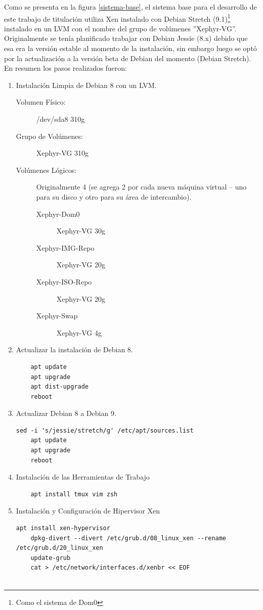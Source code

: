 Como se presenta en la figura \ref{sistema-base}, el sistema base para el desarrollo de este trabajo de titulación utiliza Xen instalado con Debian Stretch (9.1)\footnote{Como el sistema de Dom0} instalado en un LVM con el nombre del grupo de volúmenes ''Xephyr-VG''. Originalmente se tenía planificado trabajar con Debian Jessie (8.x) debido que esa era la versión estable al momento de la instalación, sin embargo luego se optó por la actualización a la versión beta de Debian del momento (Debian Stretch). En resumen los pasos realizados fueron:
\lstset{language=Bash}
\begin{enumerate}
	\item Instalación Limpia de Debian 8 con un LVM.
    	\begin{description}
    		\item[Volumen Físico:] /dev/sda8 310g 
            \item[Grupo de Volúmenes:] Xephyr-VG 310g
            \item[Volúmenes Lógicos:] Originalmente 4 (se agrega 2 por cada nueva máquina virtual -- uno para su disco y otro para su área de intercambio).
            \begin{description}
            	\item[Xephyr-Dom0] Xephyr-VG 30g
                \item[Xephyr-IMG-Repo] Xephyr-VG 20g
                \item[Xephyr-ISO-Repo] Xephyr-VG 20g
                \item[Xephyr-Swap] Xephyr-VG 4g
            \end{description}
    	\end{description}
    \item Actualizar la instalación de Debian 8.
    	\begin{lstlisting}
	apt update
	apt upgrade
	apt dist-upgrade
	reboot
        \end{lstlisting}
    \item Actualizar Debian 8 a Debian 9.
        \begin{lstlisting}[breaklines=true]
	sed -i 's/jessie/stretch/g' /etc/apt/sources.list
	apt update
	apt upgrade
	reboot
        \end{lstlisting}
    \item Instalación de las Herramientas de Trabajo
        \begin{lstlisting}
	apt install tmux vim zsh
        \end{lstlisting}
    \item Instalación y Configuración de Hipervisor Xen
		\begin{lstlisting}[breaklines=true]
	apt install xen-hypervisor
	dpkg-divert --divert /etc/grub.d/08_linux_xen --rename /etc/grub.d/20_linux_xen
	update-grub
	cat > /etc/network/interfaces.d/xenbr << EOF


\end{lstlisting}
\end{enumerate}
